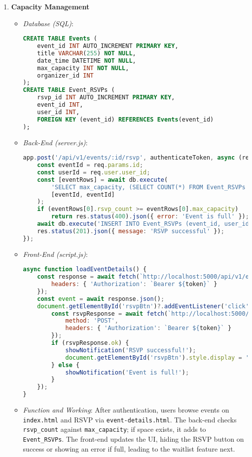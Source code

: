 \documentclass[12pt]{article}
\begin{document}
\begin{enumerate}
    \item \textbf{Capacity Management}
        \begin{itemize}
            \item \textit{Database (SQL)}:
\begin{lstlisting}[language=SQL, caption={Events and RSVPs Tables}]
CREATE TABLE Events (
    event_id INT AUTO_INCREMENT PRIMARY KEY,
    title VARCHAR(255) NOT NULL,
    date_time DATETIME NOT NULL,
    max_capacity INT NOT NULL,
    organizer_id INT
);
CREATE TABLE Event_RSVPs (
    rsvp_id INT AUTO_INCREMENT PRIMARY KEY,
    event_id INT,
    user_id INT,
    FOREIGN KEY (event_id) REFERENCES Events(event_id)
);
\end{lstlisting}
            \item \textit{Back-End (server.js)}:
\begin{lstlisting}[language=JavaScript, caption={RSVP with Capacity Check}]
app.post('/api/v1/events/:id/rsvp', authenticateToken, async (req, res) => {
    const eventId = req.params.id;
    const userId = req.user.user_id;
    const [eventRows] = await db.execute(
        'SELECT max_capacity, (SELECT COUNT(*) FROM Event_RSVPs WHERE event_id = ?) as rsvp_count FROM Events WHERE event_id = ?', 
        [eventId, eventId]
    );
    if (eventRows[0].rsvp_count >= eventRows[0].max_capacity) 
        return res.status(400).json({ error: 'Event is full' });
    await db.execute('INSERT INTO Event_RSVPs (event_id, user_id) VALUES (?, ?)', [eventId, userId]);
    res.status(201).json({ message: 'RSVP successful' });
});
\end{lstlisting}
            \item \textit{Front-End (script.js)}:
\begin{lstlisting}[language=JavaScript, caption={RSVP Action}]
async function loadEventDetails() {
    const response = await fetch(`http://localhost:5000/api/v1/events/${eventId}`, {
        headers: { 'Authorization': `Bearer ${token}` }
    });
    const event = await response.json();
    document.getElementById('rsvpBtn')?.addEventListener('click', async () => {
        const rsvpResponse = await fetch(`http://localhost:5000/api/v1/events/${eventId}/rsvp`, {
            method: 'POST',
            headers: { 'Authorization': `Bearer ${token}` }
        });
        if (rsvpResponse.ok) {
            showNotification('RSVP successful!');
            document.getElementById('rsvpBtn').style.display = 'none';
        } else {
            showNotification('Event is full!');
        }
    });
}
\end{lstlisting}
            \item \textit{Function and Working}: 
                After authentication, users browse events on \texttt{index.html} and RSVP via \texttt{event-details.html}. The back-end checks \texttt{rsvp\_count} against \texttt{max\_capacity}; if space exists, it adds to \texttt{Event\_RSVPs}. The front-end updates the UI, hiding the RSVP button on success or showing an error if full, leading to the waitlist feature next.
        \end{itemize}


\end{enumerate}
\end{document}

